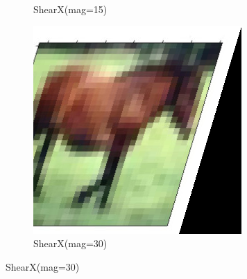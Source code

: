 \documentclass[onecolumn]{ujarticle}   %
\begin{document}
\begin{figure}[h]
\begin{subfigure}{0.3\columnwidth}
        \caption{ShearX(mag=15)}
        \label{fig:ShearX_15}
      \end{subfigure}
      \begin{subfigure}{0.3\columnwidth}
        \centering
        \includegraphics[width=1.0\columnwidth]{transform_test/ShearX_30.png}
        \caption{ShearX(mag=30)}
        \label{fig:ShearX_30}
      \end{subfigure}


\end{figure}
\end{document}
